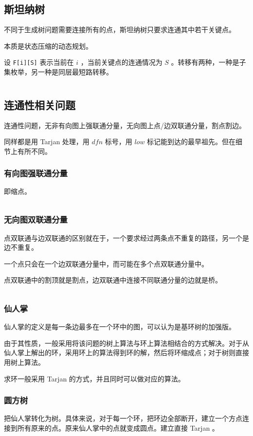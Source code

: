\documentclass[UTF-8]{ctexart}
\newcommand{\cpp}[1]{\inputminted[bgcolor=bg,breaklines,breakanywhere=true]{c++}{#1}}
\begin{document}
			\subsection{斯坦纳树}
			不同于生成树问题需要连接所有的点，斯坦纳树只要求连通其中若干关键点。
			
			本质是状态压缩的动态规划。
			
			设 \texttt{F[i][S]} 表示当前在 $i$ ，当前关键点的连通情况为 $S$ 。转移有两种，一种是子集枚举，另一种是同层最短路转移。
			
			\cpp{code//Graph//smt.cpp}
			\subsection{连通性相关问题}
			连通性问题，无非有向图上强联通分量，无向图上点/边双联通分量，割点割边。
			
			同样都是用 Tarjan 处理，用 $dfn$ 标号，用 $low$ 标记能到达的最早祖先。但在细节上有所不同。
				\subsubsection{有向图强联通分量}
				即缩点。
				\cpp{code//Graph//tarjan-direct.cpp}
				\subsubsection{无向图双联通分量}
				点双联通与边双联通的区别就在于，一个要求经过两条点不重复的路径，另一个是边不重复。
				
				一个点只会在一个边双联通分量中，而可能在多个点双联通分量中。
				
				点双联通中的割顶就是割点，边双联通中连接不同联通分量的边就是桥。
				\cpp{code//Graph//tarjan-undirect.cpp}
				\subsubsection{仙人掌}
				仙人掌的定义是每一条边最多在一个环中的图，可以认为是基环树的加强版。
				
				由于其性质，一般采用将该问题的树上算法与环上算法相结合的方式解决。对于从仙人掌上解出的环，采用环上的算法得到环的解，然后将环缩成点；对于树则直接用树上算法。
				
				求环一般采用 Tarjan 的方式，并且同时可以做对应的算法。
				\subsubsection{圆方树}
				把仙人掌转化为树。具体来说，对于每一个环，把环边全部断开，建立一个方点连接到所有原来的点。原来仙人掌中的点就变成圆点。建立直接 Tarjan 。
				
\end{document}
